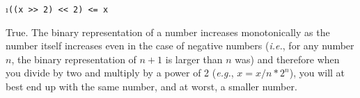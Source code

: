 \documentclass[fleqn]{article}
\begin{document}
 \i \texttt{((x >> 2) << 2) <= x}

 \begin{solution}
   True. The binary representation of a number increases monotonically as the number itself increases even in the case of negative numbers (\textit{i.e.}, for any number $n$, the binary representation of $n+1$ is larger than $n$ was) and therefore when you divide by two and multiply by a power of 2 (\textit{e.g.}, $x = x/n * 2^n$), you will at best end up with the same number, and at worst, a smaller number.
 \end{solution}

\ene
\end{document}
